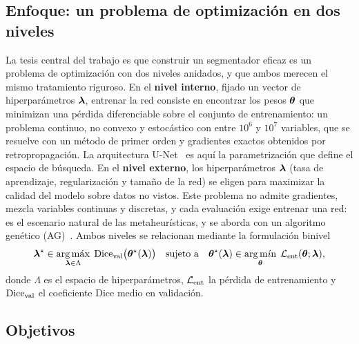 \subsection{Enfoque: un problema de optimización en dos niveles}\label{subsec:enfoque}

La tesis central del trabajo es que construir un segmentador eficaz es un problema de optimización con dos niveles anidados, y que ambos merecen el mismo tratamiento riguroso. En el \textbf{nivel interno}, fijado un vector de hiperparámetros $\bm{\lambda}$, entrenar la red consiste en encontrar los pesos $\bm{\theta}$ que minimizan una pérdida diferenciable sobre el conjunto de entrenamiento: un problema continuo, no convexo y estocástico con entre $10^6$ y $10^7$ variables, que se resuelve con un método de primer orden y gradientes exactos obtenidos por retropropagación. La arquitectura U-Net~\cite{ronneberger2015unet} es aquí la parametrización que define el espacio de búsqueda. En el \textbf{nivel externo}, los hiperparámetros $\bm{\lambda}$ (tasa de aprendizaje, regularización y tamaño de la red) se eligen para maximizar la calidad del modelo sobre datos no vistos. Este problema no admite gradientes, mezcla variables continuas y discretas, y cada evaluación exige entrenar una red: es el escenario natural de las metaheurísticas, y se aborda con un algoritmo genético (AG)~\cite{goldberg1989genetic}. Ambos niveles se relacionan mediante la formulación binivel
\begin{equation}\label{eq:binivel}
  \bm{\lambda}^{\star} \in \operatorname*{arg\,m\acute{a}x}_{\bm{\lambda} \in \Lambda} \; \operatorname{Dice}_{\mathrm{val}}\bigl(\bm{\theta}^{\star}(\bm{\lambda})\bigr)
  \quad \text{sujeto a} \quad
  \bm{\theta}^{\star}(\bm{\lambda}) \in \operatorname*{arg\,m\acute{\imath}n}_{\bm{\theta}} \; \mathcal{L}_{\mathrm{ent}}(\bm{\theta};\bm{\lambda}),
\end{equation}
donde $\Lambda$ es el espacio de hiperparámetros, $\mathcal{L}_{\mathrm{ent}}$ la pérdida de entrenamiento y $\operatorname{Dice}_{\mathrm{val}}$ el coeficiente Dice medio en validación.

\subsection{Objetivos}\label{subsec:objetivos}

